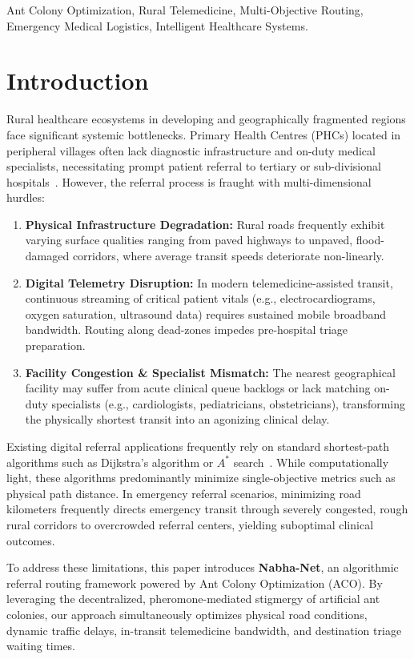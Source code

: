 \documentclass[conference]{IEEEtran}
\begin{document}
\begin{IEEEkeywords}
Ant Colony Optimization, Rural Telemedicine, Multi-Objective Routing, Emergency Medical Logistics, Intelligent Healthcare Systems.
\end{IEEEkeywords}

\section{Introduction}
Rural healthcare ecosystems in developing and geographically fragmented regions face significant systemic bottlenecks. Primary Health Centres (PHCs) located in peripheral villages often lack diagnostic infrastructure and on-duty medical specialists, necessitating prompt patient referral to tertiary or sub-divisional hospitals~\cite{ref_who_rural}. However, the referral process is fraught with multi-dimensional hurdles:
\begin{enumerate}
    \item \textbf{Physical Infrastructure Degradation:} Rural roads frequently exhibit varying surface qualities ranging from paved highways to unpaved, flood-damaged corridors, where average transit speeds deteriorate non-linearly.
    \item \textbf{Digital Telemetry Disruption:} In modern telemedicine-assisted transit, continuous streaming of critical patient vitals (e.g., electrocardiograms, oxygen saturation, ultrasound data) requires sustained mobile broadband bandwidth. Routing along dead-zones impedes pre-hospital triage preparation.
    \item \textbf{Facility Congestion \& Specialist Mismatch:} The nearest geographical facility may suffer from acute clinical queue backlogs or lack matching on-duty specialists (e.g., cardiologists, pediatricians, obstetricians), transforming the physically shortest transit into an agonizing clinical delay.
\end{enumerate}

Existing digital referral applications frequently rely on standard shortest-path algorithms such as Dijkstra's algorithm or $A^*$ search~\cite{ref_dijkstra, ref_astar}. While computationally light, these algorithms predominantly minimize single-objective metrics such as physical path distance. In emergency referral scenarios, minimizing road kilometers frequently directs emergency transit through severely congested, rough rural corridors to overcrowded referral centers, yielding suboptimal clinical outcomes.

To address these limitations, this paper introduces \textbf{Nabha-Net}, an algorithmic referral routing framework powered by Ant Colony Optimization (ACO). By leveraging the decentralized, pheromone-mediated stigmergy of artificial ant colonies, our approach simultaneously optimizes physical road conditions, dynamic traffic delays, in-transit telemedicine bandwidth, and destination triage waiting times.
\end{document}
